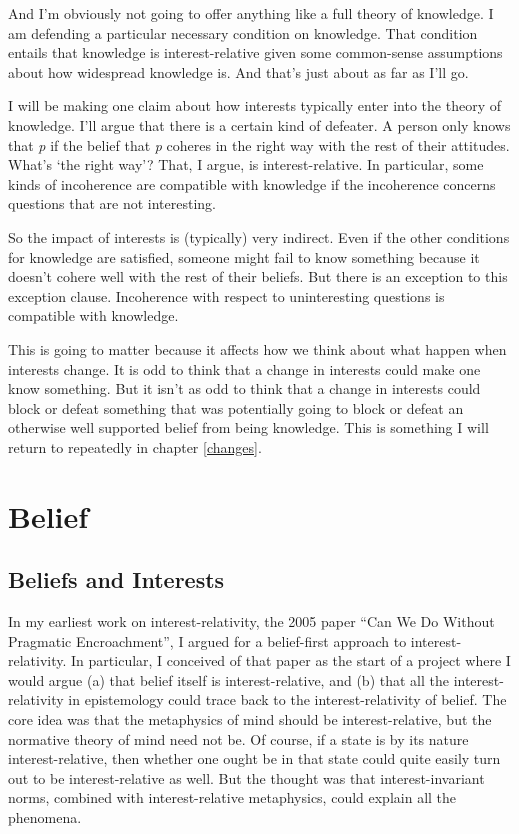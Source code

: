 \documentclass[
  11pt,
]{book}
\begin{document}
And I'm obviously not going to offer anything like a full theory of knowledge. I am defending a particular necessary condition on knowledge. That condition entails that knowledge is interest-relative given some common-sense assumptions about how widespread knowledge is. And that's just about as far as I'll go.

I will be making one claim about how interests typically enter into the theory of knowledge. I'll argue that there is a certain kind of defeater. A person only knows that \emph{p} if the belief that \emph{p} coheres in the right way with the rest of their attitudes. What's `the right way'? That, I argue, is interest-relative. In particular, some kinds of incoherence are compatible with knowledge if the incoherence concerns questions that are not interesting.

So the impact of interests is (typically) very indirect. Even if the other conditions for knowledge are satisfied, someone might fail to know something because it doesn't cohere well with the rest of their beliefs. But there is an exception to this exception clause. Incoherence with respect to uninteresting questions is compatible with knowledge.

This is going to matter because it affects how we think about what happen when interests change. It is odd to think that a change in interests could make one know something. But it isn't as odd to think that a change in interests could block or defeat something that was potentially going to block or defeat an otherwise well supported belief from being knowledge. This is something I will return to repeatedly in chapter \ref{changes}.

\hypertarget{belief}{%
\chapter{Belief}\label{belief}}

\hypertarget{beliefsinterests}{%
\section{Beliefs and Interests}\label{beliefsinterests}}

In my earliest work on interest-relativity, the 2005 paper ``Can We Do Without Pragmatic Encroachment'', I argued for a belief-first approach to interest-relativity. In particular, I conceived of that paper as the start of a project where I would argue (a) that belief itself is interest-relative, and (b) that all the interest-relativity in epistemology could trace back to the interest-relativity of belief. The core idea was that the metaphysics of mind should be interest-relative, but the normative theory of mind need not be. Of course, if a state is by its nature interest-relative, then whether one ought be in that state could quite easily turn out to be interest-relative as well. But the thought was that interest-invariant norms, combined with interest-relative metaphysics, could explain all the phenomena.
\end{document}
